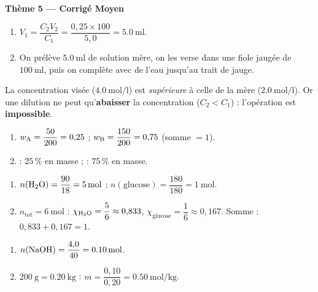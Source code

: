 \documentclass[11pt,a4paper]{article}
\begin{document}
\begin{center}{\large\bfseries\color{primarydark} Thème 5 — Corrigé Moyen}\end{center}

\begin{corrige}
\begin{enumerate}[label=\alph*)]
  \item $V_1 = \dfrac{C_2 V_2}{C_1} = \dfrac{0{,}25\times 100}{5{,}0} = \SI{5.0}{\milli\litre}$.
  \item On prélève $\SI{5.0}{\milli\litre}$ de solution mère, on les verse dans une fiole jaugée de
        $\SI{100}{\milli\litre}$, puis on complète avec de l'eau jusqu'au trait de jauge.
\end{enumerate}
\end{corrige}

\begin{corrige}
La concentration visée ($\SI{4.0}{\mole\per\litre}$) est \emph{supérieure} à celle de la mère
($\SI{2.0}{\mole\per\litre}$). Or une dilution ne peut qu'\textbf{abaisser} la concentration
($C_2 < C_1$) : l'opération est \textbf{impossible}.
\end{corrige}

\begin{corrige}
\begin{enumerate}[label=\alph*)]
  \item $w_{\ce{A}} = \dfrac{50}{200} = 0{,}25$ ; $w_{\ce{B}} = \dfrac{150}{200} = 0{,}75$ (somme $=1$).
  \item {} : $25\,\%$ en masse ;  : $75\,\%$ en masse.
\end{enumerate}
\end{corrige}

\begin{corrige}
\begin{enumerate}[label=\alph*)]
  \item $n(\ce{H2O}) = \dfrac{90}{18} = \SI{5}{\mole}$ ; $n(\text{glucose}) = \dfrac{180}{180} = \SI{1}{\mole}$.
  \item $n_{\text{tot}} = \SI{6}{\mole}$ : $\chi_{\ce{H2O}} = \dfrac{5}{6} \approx 0{,}833$,
        $\chi_{\text{glucose}} = \dfrac{1}{6} \approx 0{,}167$. Somme : $0{,}833 + 0{,}167 = 1$.
\end{enumerate}
\end{corrige}

\begin{corrige}
\begin{enumerate}[label=\alph*)]
  \item $n(\ce{NaOH}) = \dfrac{4{,}0}{40} = \SI{0.10}{\mole}$.
  \item $\SI{200}{\gram} = \SI{0.20}{\kilo\gram}$ : $m = \dfrac{0{,}10}{0{,}20} = \SI{0.50}{\mole\per\kilo\gram}$.
\end{enumerate}
\end{corrige}
\end{document}
